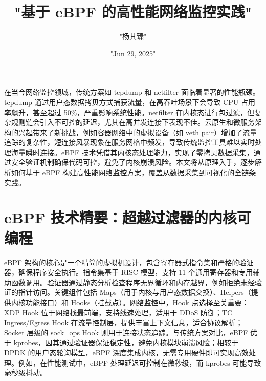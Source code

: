 \title{"基于 eBPF 的高性能网络监控实践"}
\author{"杨其臻"}
\date{"Jun 29, 2025"}
\maketitle
在当今网络监控领域，传统方案如 tcpdump 和 netfilter 面临着显著的性能瓶颈。tcpdump 通过用户态数据拷贝方式捕获流量，在高吞吐场景下会导致 CPU 占用率飙升，甚至超过 50\%{}，严重影响系统性能。netfilter 在内核态进行包过滤，但复杂规则链会引入不可控的延迟，尤其在高并发连接下表现不佳。云原生和微服务架构的兴起带来了新挑战，例如容器网络中的虚拟设备（如 veth pair）增加了流量追踪的复杂性，短连接风暴现象在服务网格中频发，导致传统监控工具难以实时处理海量瞬时连接。eBPF 技术凭借其内核态处理能力，实现了零拷贝数据采集，通过安全验证机制确保代码可控，避免了内核崩溃风险。本文将从原理入手，逐步解析如何基于 eBPF 构建高性能网络监控方案，覆盖从数据采集到可视化的全链条实践。\par
\chapter{eBPF 技术精要：超越过滤器的内核可编程}
eBPF 架构的核心是一个精简的虚拟机设计，包含寄存器式指令集和严格的验证器，确保程序安全执行。指令集基于 RISC 模型，支持 11 个通用寄存器和专用辅助函数调用。验证器通过静态分析检查程序无界循环和内存越界，例如拒绝未经验证的指针访问。关键组件包括 Maps（用于内核与用户态数据交换）、Helpers（提供内核功能接口）和 Hooks（挂载点）。网络监控中，Hook 点选择至关重要：XDP Hook 位于网络栈最前端，支持线速处理，适用于 DDoS 防御；TC Ingress/Egress Hook 在流量控制层，提供丰富上下文信息，适合协议解析；Socket 层级的 sock\_{}ops Hook 则用于连接状态追踪。与传统方案对比，eBPF 优于 kprobes，因其通过验证器保证稳定性，避免内核模块崩溃风险；相较于 DPDK 的用户态轮询模型，eBPF 深度集成内核，无需专用硬件即可实现高效处理。例如，在性能测试中，eBPF 处理延迟可控制在微秒级，而 kprobes 可能导致毫秒级抖动。\par
